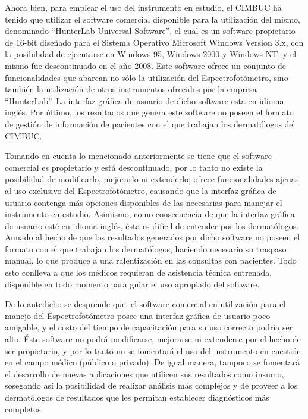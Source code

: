 Ahora bien, para emplear el uso del instrumento en estudio, el CIMBUC ha tenido que utilizar el software comercial disponible para la utilizaci\'{o}n del mismo, denominado ``HunterLab Universal Software'', el cual es un software propietario de 16-bit dise\~{n}ado para el Sistema Operativo Microsoft Windows Version 3.x, con la posibilidad de ejecutarse en Windows 95, Windows 2000 y Windows NT, y el mismo fue descontinuado en el a\~{n}o 2008. Este software ofrece un conjunto de funcionalidades que abarcan no s\'{o}lo la utilizaci\'{o}n del Espectrofot\'{o}metro, sino tambi\'{e}n la utilizaci\'{o}n de otros instrumentos ofrecidos por la empresa ``HunterLab''. La interfaz gr\'{a}fica de usuario de dicho software esta en idioma ingl\'{e}s. Por \'{u}ltimo, los resultados que genera este software no poseen el formato de gesti\'{o}n de informaci\'{o}n de pacientes con el que trabajan los dermat\'{o}logos del CIMBUC.

Tomando en cuenta lo mencionado anteriormente se tiene que el software comercial es propietario y est\'{a} descontinuado, por lo tanto no existe la posibilidad de modificarlo, mejorarlo ni extenderlo; ofrece funcionalidades ajenas al uso exclusivo del Espectrofot\'{o}metro, causando que la interfaz gr\'{a}fica de usuario contenga m\'{a}s opciones disponibles de las necesarias para manejar el instrumento en estudio. Asimismo, como consecuencia de que la interfaz gr\'{a}fica de usuario est\'{e} en idioma ingl\'{e}s, \'{e}sta es dif\'{i}cil de entender por los dermat\'{o}logos. Aunado al hecho de que los resultados generados por dicho software no poseen el formato con el que trabajan los dermat\'{o}logos, haciendo necesario su traspaso manual, lo que produce a una ralentizaci\'{o}n en las consultas con pacientes. Todo esto conlleva a que los m\'{e}dicos requieran de asistencia t\'{e}cnica entrenada, disponible en todo momento para guiar el uso apropiado del software.

De lo antedicho se desprende que, el software comercial en utilizaci\'{o}n para el manejo del Espectrofot\'{o}metro posee una interfaz gr\'{a}fica de usuario poco amigable, y el costo del tiempo de capacitaci\'{o}n para su uso correcto podr\'{i}a ser alto. \'{E}ste software no podr\'{a} modificarse, mejorarse ni extenderse por el hecho de ser propietario, y por lo tanto no se fomentar\'{a} el uso del instrumento en cuesti\'{o}n en el campo m\'{e}dico (p\'{u}blico o privado). De igual manera, tampoco se fomentar\'{a} el desarrollo de nuevas aplicaciones que utilicen sus resultados como insumo, sosegando as\'{i} la posibilidad de realizar an\'{a}lisis m\'{a}s complejos y de proveer a los dermat\'{o}logos de resultados que les permitan establecer diagn\'{o}sticos m\'{a}s completos.

